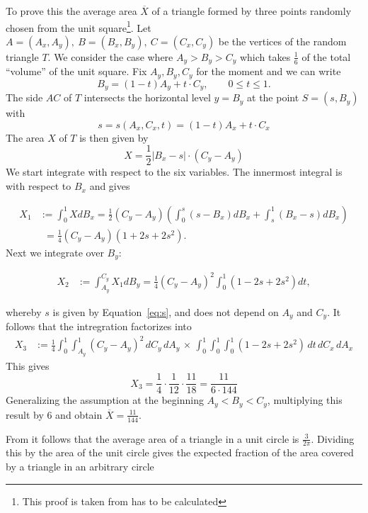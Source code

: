 \documentclass[11pt]{scrreprt}
\begin{document}
To prove this the average area $\overline{X}$ of a triangle formed by three points randomly chosen from the unit square\footnote{This proof is taken
from has to be calculated\cite{Blatter:2015}}. Let \( A = (A_x, A_y),\ B = (B_x, B_y),\ C = (C_x, C_y)\) be the vertices of the random triangle \( T \). We consider the case where \( A_y
> B_y > C_y \) which takes $\frac{1}{6}$ of the total ``volume'' of the unit square. Fix \( A_y, B_y, C_y \) for the moment and we can write
\[
  B_y = (1-t) A_y + t\cdot C_y, \qquad 0 \leq t \leq 1.
\]
The side $AC$ of $T$ intersects the horizontal level $y=B_y$ at the point $S=(s,B_y)$ with
\begin{equation}
  s = s(A_x,C_x,t) = (1-t)A_x + t\cdot C_x\label{eq:s}
\end{equation}
The area $X$ of $T$ is then given by
\[
  X = \frac{1}{2}\lvert B_x - s\rvert\cdot(C_y - A_y)
\]
We start integrate with respect to the six variables. The innermost integral is with respect to $B_x$ and gives

\begin{align}
  X_1 &:= \int_0^1XdB_x=\frac{1}{2}(C_y-A_y)\left( \int_0^s(s-B_x)dB_x + \int_s^1(B_x-s)dB_x\right)\nonumber\\
      &\phantom{:}= \frac{1}{4}(C_y-A_y)(1+2s+2s^2).\nonumber
\end{align}
Next we integrate over $B_y$:

\begin{align}
  X_2 &:= \int_{A_y}^{C_y}X_1dB_y = \frac{1}{4}(C_y-A_y)^2\int_0^1(1-2s+2s^2)dt,
\end{align}

whereby $s$ is given by Equation~\ref{eq:s}, and does not depend on $A_y$ and $C_y$. It follows that the intregration factorizes into
\begin{align}
  X_3 &:= \frac{1}{4}\int_0^1\int_{A_y}^1(C_y-A_y)^2\,dC_y\,dA_y\,\times\,\int_0^1\int_0^1\int_0^1(1-2s+2s^2)\,dt\,dC_x\,dA_x  \nonumber
\end{align}
This gives
\[
  X_3 = \frac{1}{4}\cdot \frac{1}{12} \cdot \frac{11}{18} = \frac{11}{6\cdot144}
\]
Generalizing the assumption at the beginning $A_y < B_y < C_y$, multiplying this result by $6$ and obtain $\overline{X}=\frac{11}{144}$.

From \cite{Weisstein2016} it follows that the average area of a triangle in a unit circle is $\frac{3}{2\pi}$. Dividing this by the area of the unit circle gives the expected fraction of the area covered by a triangle in an arbitrary circle
\end{document}
